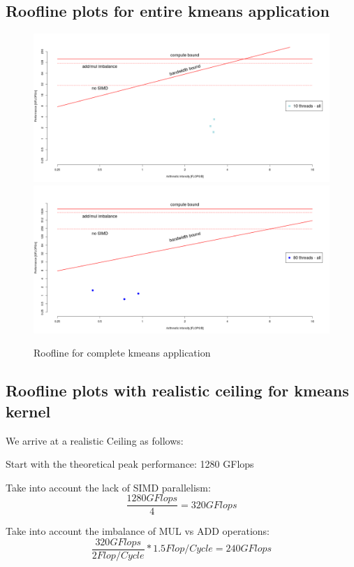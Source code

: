 \subsection{Roofline plots for entire kmeans application}

\begin{figure}[ht]
	\centering
	\includegraphics[scale=.4]{figures/roofline-mars-10tall.png}
	\includegraphics[scale=.4]{figures/roofline-mars-80tall.png}
	\caption{Roofline for complete kmeans application}
	\label{fig:runtime}
\end{figure}

\subsection{Roofline plots with realistic ceiling for kmeans kernel}

We arrive at a realistic Ceiling as follows:

Start with the theoretical peak performance: 1280 GFlops

Take into account the lack of SIMD parallelism:
$$\frac{1280 GFlops}{4} = 320 GFlops$$

Take into account the imbalance of MUL vs ADD operations:
$$\frac{320 GFlops}{2 Flop/Cycle} *1.5 Flop/Cycle = 240 GFlops$$

